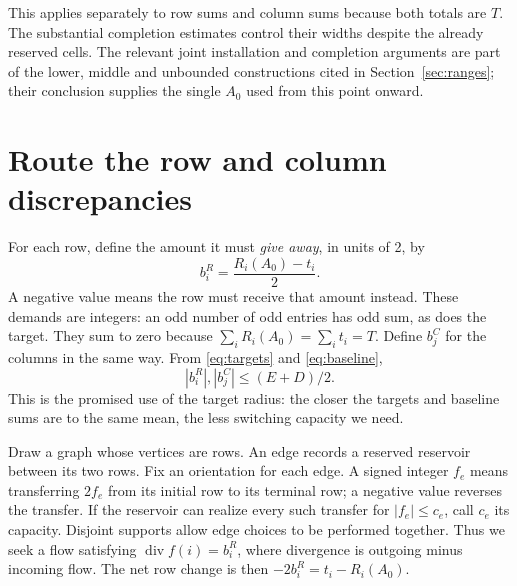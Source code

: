 \documentclass[11pt]{article}
\theoremstyle{definition}
\begin{document}
This applies separately to row sums and column sums because both totals are
\(T\). The substantial completion estimates control their widths despite the
already reserved cells. The relevant joint installation and completion
arguments are part of the lower, middle and unbounded constructions cited
in Section~\ref{sec:ranges}; their conclusion supplies the single \(A_0\)
used from this point onward.

\section{Route the row and column discrepancies}\label{sec:routing}

For each row, define the amount it must \emph{give away}, in units of 2, by
\[
 b_i^R=\frac{R_i(A_0)-t_i}{2}.
\]
A negative value means the row must receive that amount instead. These demands
are integers: an odd number of odd entries has odd sum, as does the target.
They sum to zero because \(\sum_iR_i(A_0)=\sum_it_i=T\). Define \(b_j^C\)
for the columns in the same way. From \eqref{eq:targets} and
\eqref{eq:baseline},
\begin{equation}\label{eq:demand-bound}
 |b_i^R|,|b_j^C|\le (E+D)/2.
\end{equation}
This is the promised use of the target radius: the closer the targets and
baseline sums are to the same mean, the less switching capacity we need.

Draw a graph whose vertices are rows. An edge records a reserved reservoir
between its two rows. Fix an orientation for each edge. A signed integer
\(f_e\) means transferring \(2f_e\) from its initial row to its terminal row;
a negative value reverses the transfer. If the reservoir can realize every
such transfer for \(|f_e|\le c_e\), call \(c_e\) its capacity. Disjoint supports
allow edge choices to be performed together. Thus we seek a flow satisfying
\(\operatorname{div}f(i)=b_i^R\), where divergence is outgoing minus incoming
flow. The net row change is then \(-2b_i^R=t_i-R_i(A_0)\).
\end{document}

